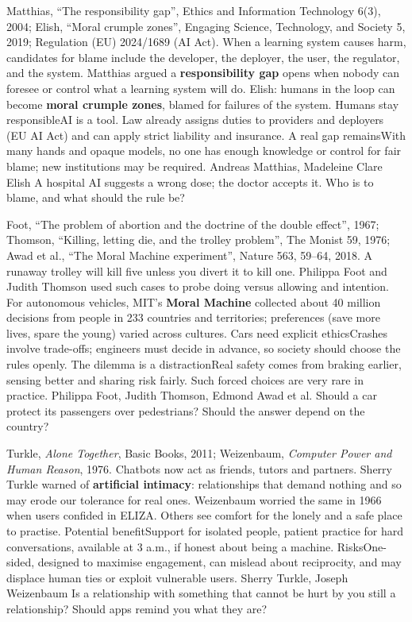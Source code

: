 {Matthias, ``The responsibility gap'', Ethics and Information Technology 6(3), 2004; Elish, ``Moral crumple zones'', Engaging Science, Technology, and Society 5, 2019; Regulation (EU) 2024/1689 (AI Act).}
{When a learning system causes harm, candidates for blame include the developer, the deployer, the user, the regulator, and the system. Matthias argued a \textbf{responsibility gap} opens when nobody can foresee or control what a learning system will do. Elish: humans in the loop can become \textbf{moral crumple zones}, blamed for failures of the system.}
{Humans stay responsible}{AI is a tool. Law already assigns duties to providers and deployers (EU AI Act) and can apply strict liability and insurance.}
{A real gap remains}{With many hands and opaque models, no one has enough knowledge or control for fair blame; new institutions may be required.}
{Andreas Matthias, Madeleine Clare Elish}
{A hospital AI suggests a wrong dose; the doctor accepts it. Who is to blame, and what should the rule be?}

{Foot, ``The problem of abortion and the doctrine of the double effect'', 1967; Thomson, ``Killing, letting die, and the trolley problem'', The Monist 59, 1976; Awad et al., ``The Moral Machine experiment'', Nature 563, 59--64, 2018.}
{A runaway trolley will kill five unless you divert it to kill one. Philippa Foot and Judith Thomson used such cases to probe doing versus allowing and intention. For autonomous vehicles, MIT's \textbf{Moral Machine} collected about 40 million decisions from people in 233 countries and territories; preferences (save more lives, spare the young) varied across cultures.}
{Cars need explicit ethics}{Crashes involve trade-offs; engineers must decide in advance, so society should choose the rules openly.}
{The dilemma is a distraction}{Real safety comes from braking earlier, sensing better and sharing risk fairly. Such forced choices are very rare in practice.}
{Philippa Foot, Judith Thomson, Edmond Awad et al.}
{Should a car protect its passengers over pedestrians? Should the answer depend on the country?}

{Turkle, \emph{Alone Together}, Basic Books, 2011; Weizenbaum, \emph{Computer Power and Human Reason}, 1976.}
{Chatbots now act as friends, tutors and partners. Sherry Turkle warned of \textbf{artificial intimacy}: relationships that demand nothing and so may erode our tolerance for real ones. Weizenbaum worried the same in 1966 when users confided in ELIZA. Others see comfort for the lonely and a safe place to practise.}
{Potential benefit}{Support for isolated people, patient practice for hard conversations, available at 3 a.m., if honest about being a machine.}
{Risks}{One-sided, designed to maximise engagement, can mislead about reciprocity, and may displace human ties or exploit vulnerable users.}
{Sherry Turkle, Joseph Weizenbaum}
{Is a relationship with something that cannot be hurt by you still a relationship? Should apps remind you what they are?}

